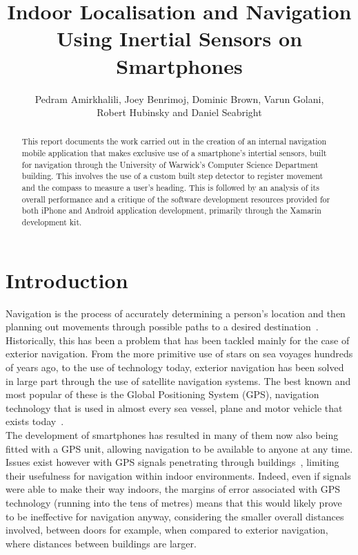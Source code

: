 \documentclass[12pt,a4paper]{report}
\title{Indoor Localisation and Navigation Using Inertial Sensors on Smartphones}
\author{Pedram Amirkhalili, Joey Benrimoj,  Dominic Brown, Varun Golani, \\Robert Hubinsky and Daniel Seabright  }
\date{}
\begin{document}
\maketitle

\tableofcontents

\pagebreak

\begin{abstract}
This report documents the work carried out in the creation of an internal navigation mobile application that makes exclusive use of a smartphone's intertial sensors, built for navigation through the University of Warwick's Computer Science Department building. This involves the use of a custom built step detector to register movement and the compass to measure a user's heading. This is followed by an analysis of its overall performance and a critique of the software development resources provided for both iPhone and Android application development, primarily through the Xamarin development kit.
\end{abstract}

\chapter{Introduction}

Navigation is the process of accurately determining a person's location and then planning out movements through possible paths to a desired destination~\cite{navMeaning}. Historically, this has been a problem that has been tackled mainly for the case of exterior navigation. From the more primitive use of stars on sea voyages hundreds of years ago, to the use of technology today, exterior navigation has been solved in large part through the use of satellite navigation systems. The best known and most popular of these is the Global Positioning System (GPS), navigation technology that is used in almost every sea vessel, plane and motor vehicle that exists today~\cite{gps}.\\

The development of smartphones has resulted in many of them now also being fitted with a GPS unit, allowing navigation to be available to anyone at any time. Issues exist however with GPS signals penetrating through buildings~\cite{gps}, limiting their usefulness for navigation within indoor environments. Indeed, even if signals were able to make their way indoors, the margins of error associated with GPS technology (running into the tens of metres) means that this would likely prove to be ineffective for navigation anyway, considering the smaller overall distances involved, between doors for example, when compared to exterior navigation, where distances between buildings are larger.\\
\end{document}
